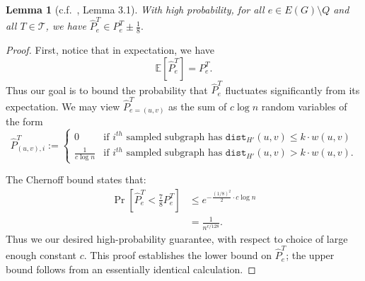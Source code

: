 \documentclass{article}
\theoremstyle{plain}
\newtheorem{lemma}[theorem]{Lemma}
\theoremstyle{definition}
\newcommand{\dist}{\texttt{dist}}
\begin{document}
\begin{lemma} [c.f.~\cite{BDR21}, Lemma 3.1] \label{lem:whpguarantee}
With high probability, for all $e \in E(G) \setminus Q$ and all $T \in \mathcal{T}$, we have
$\widehat{P}^T_e \in P^T_e \pm \frac{1}{8}.$
\end{lemma}
\begin{proof}
First, notice that in expectation, we have
$$\mathbb{E}\left[\widehat{P}^T_e\right] = P^T_e.$$
Thus our goal is to bound the probability that $\widehat{P}^T_e$ fluctuates significantly from its expectation.
We may view $\widehat{P}^T_{e=(u, v)}$ as the sum of $c \log n$ random variables of the form
$$\widehat{P}^T_{(u, v), i} := \begin{cases}
0 & \text{if } i^{th} \text{ sampled subgraph has } \dist_{H'}(u, v) \le k \cdot w(u, v)\\
\frac{1}{c \log n} & \text{if } i^{th} \text{ sampled subgraph has } \dist_{H'}(u, v) > k \cdot w(u, v).
\end{cases}$$

The Chernoff bound states that:
\begin{align*}
\Pr\left[ \widehat{P}_e^T < \frac{7}{8} P_e^T \right] &\le e^{-\frac{(1/8)^2}{2} \cdot c \log n}\\
&= \frac{1}{n^{c/128}}.
\end{align*}
Thus we our desired high-probability guarantee, with respect to choice of large enough constant $c$.
This proof establishes the lower bound on $\widehat{P}^T_e$; the upper bound follows from an essentially identical calculation.
\end{proof}
\end{document}
